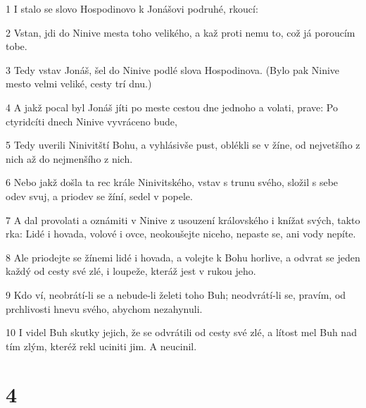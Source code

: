 \par 1 I stalo se slovo Hospodinovo k Jonášovi podruhé, rkoucí:
\par 2 Vstan, jdi do Ninive mesta toho velikého, a kaž proti nemu to, což já poroucím tobe.
\par 3 Tedy vstav Jonáš, šel do Ninive podlé slova Hospodinova. (Bylo pak Ninive mesto velmi veliké, cesty trí dnu.)
\par 4 A jakž pocal byl Jonáš jíti po meste cestou dne jednoho a volati, prave: Po ctyridcíti dnech Ninive vyvráceno bude,
\par 5 Tedy uverili Ninivitští Bohu, a vyhlásivše pust, oblékli se v žíne, od nejvetšího z nich až do nejmenšího z nich.
\par 6 Nebo jakž došla ta rec krále Ninivitského, vstav s trunu svého, složil s sebe odev svuj, a priodev se žíní, sedel v popele.
\par 7 A dal provolati a oznámiti v Ninive z usouzení královského i knížat svých, takto rka: Lidé i hovada, volové i ovce, neokoušejte niceho, nepaste se, ani vody nepíte.
\par 8 Ale priodejte se žínemi lidé i hovada, a volejte k Bohu horlive, a odvrat se jeden každý od cesty své zlé, i loupeže, kteráž jest v rukou jeho.
\par 9 Kdo ví, neobrátí-li se a nebude-li želeti toho Buh; neodvrátí-li se, pravím, od prchlivosti hnevu svého, abychom nezahynuli.
\par 10 I videl Buh skutky jejich, že se odvrátili od cesty své zlé, a lítost mel Buh nad tím zlým, kteréž rekl uciniti jim. A neucinil.

\chapter{4}

